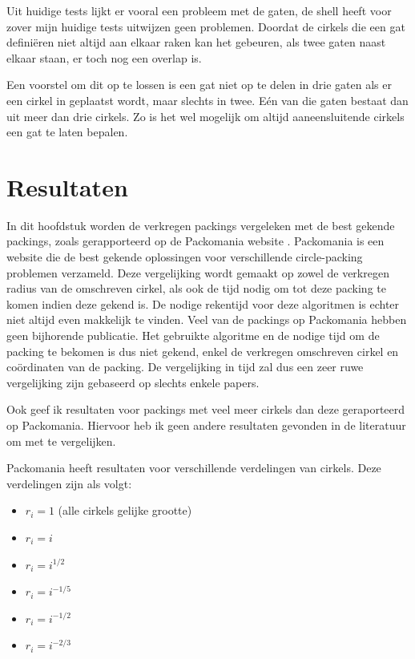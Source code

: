 \documentclass[12pt,a4paper,oneside]{book}
\begin{document}
Uit huidige tests lijkt er vooral een probleem met de gaten, de shell heeft voor zover mijn huidige tests uitwijzen geen problemen.
Doordat de cirkels die een gat definiëren niet altijd aan elkaar raken kan het gebeuren, als twee gaten naast elkaar staan, er toch nog een overlap is.

Een voorstel om dit op te lossen is een gat niet op te delen in drie gaten als er een cirkel in geplaatst wordt, maar slechts in twee.
Eén van die gaten bestaat dan uit meer dan drie cirkels.
Zo is het wel mogelijk om altijd aaneensluitende cirkels een gat te laten bepalen.

\chapter{Resultaten} \label{chap:resultaten}

In dit hoofdstuk worden de verkregen packings vergeleken met de best gekende packings, zoals gerapporteerd op de Packomania website \cite{packomania}.
Packomania is een website die de best gekende oplossingen voor verschillende circle-packing problemen verzameld.
Deze vergelijking wordt gemaakt op zowel de verkregen radius van de omschreven cirkel, als ook de tijd nodig om tot deze packing te komen indien deze gekend is.
De nodige rekentijd voor deze algoritmen is echter niet altijd even makkelijk te vinden.
Veel van de packings op Packomania hebben geen bijhorende publicatie.
Het gebruikte algoritme en de nodige tijd om de packing te bekomen is dus niet gekend, enkel de verkregen omschreven cirkel en coördinaten van de packing.
De vergelijking in tijd zal dus een zeer ruwe vergelijking zijn gebaseerd op slechts enkele papers.

Ook geef ik resultaten voor packings met veel meer cirkels dan deze geraporteerd op Packomania.
Hiervoor heb ik geen andere resultaten gevonden in de literatuur om met te vergelijken.

Packomania heeft resultaten voor verschillende verdelingen van cirkels.
Deze verdelingen zijn als volgt:

\begin{itemize}
	\item $r_i=1$ (alle cirkels gelijke grootte)
	\item $r_i=i$
	\item $r_i=i^{1/2}$
	\item $r_i=i^{-1/5}$
	\item $r_i=i^{-1/2}$
	\item $r_i=i^{-2/3}$
\end{itemize}
\end{document}

